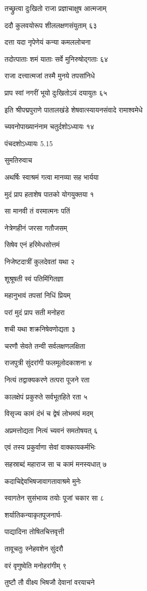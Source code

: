 तच्छ्रुत्वा दुःखितो राजा प्रज्ञाचाक्षुष आत्मजाम्

ददौ कुलवयोरूप शीललक्षणसंयुताम् ६३

दत्ता यदा नृपेणेयं कन्या कमललोचना

तदोत्पाताः शमं याताः सर्वे मुनिरुषोद्गताः ६४

राजा दत्त्वात्मजां तस्मै मुनये तपसांनिधे

प्राप स्वां नगरीं भूयो दुःखितोऽयं दयायुतः ६५

इति श्रीपद्मपुराणे पातालखंडे शेषवात्स्यायनसंवादे रामाश्वमेधे

च्यवनोपाख्यानंनाम चतुर्दशोऽध्यायः १४

पंचदशोऽध्यायः 5.15

सुमतिरुवाच

अथर्षिः स्वाश्रमं गत्वा मानव्या सह भार्यया

मुदं प्राप हताशेष पातको योगयुक्तया १

सा मानवी तं वरमात्मनः पतिं

नेत्रेणहीनं जरसा गतौजसम्

सिषेव एनं हरिमेधसोत्तमं

निजेष्टदात्रीं कुलदेवतां यथा २

शूश्रूषती स्वं पतिमिंगितज्ञा

महानुभावं तपसां निधिं प्रियम्

परां मुदं प्राप सती मनोहरा

शची यथा शक्रनिषेवणोद्यता ३

चरणौ सेवते तन्वी सर्वलक्षणलक्षिता

राजपुत्री सुंदरांगी फलमूलोदकाशना ४

नित्यं तद्वाक्यकरणे तत्परा पूजने रता

कालक्षेपं प्रकुरुते सर्वभूतहिते रता ५

विसृज्य कामं दंभं च द्वेषं लोभमघं मदम्

अप्रमत्तोद्यता नित्यं च्यवनं समतोषयत् ६

एवं तस्य प्रकुर्वाणा सेवां वाक्कायकर्मभिः

सहस्राब्दं महाराज सा च कामं मनस्यधात् ७

कदाचिद्देवभिषजावागतावाश्रमे मुनेः

स्वागतेन सुसंभाव्य तयोः पूजां चकार सा ८

शर्यातिकन्याकृतपूजनार्घ-

पाद्यादिना तोषितचित्तवृत्ती

तावूचतुः स्नेहवशेन सुंदरौ

वरं वृणुष्वेति मनोहरांगीम् ९

तुष्टौ तौ वीक्ष्य भिषजौ देवानां वरयाचने


